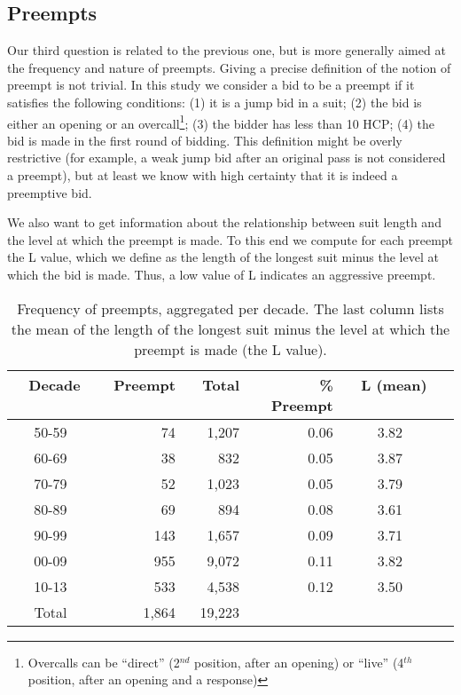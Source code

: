 \documentclass{llncs}
\begin{document}
\subsection{Preempts}

Our third question is related to the previous one, but is more
generally aimed at the frequency and nature of preempts. Giving a
precise definition of the notion of preempt is not trivial. In this
study we consider a bid to be a preempt if it satisfies the following
conditions: (1) it is a jump bid in a suit; (2) the bid is either an
opening or an overcall\footnote{%
  Overcalls can be ``direct'' (2$^{nd}$ position, after an opening) or
  ``live'' (4$^{th}$ position, after an opening and a response)}; (3)
the bidder has less than 10 HCP; (4) the bid is made in the first
round of bidding.  This definition might be overly restrictive (for
example, a weak jump bid after an original pass is not considered a
preempt), but at least we know with high certainty that it is indeed a
preemptive bid.

We also want to get information about the relationship between suit
length and the level at which the preempt is made. To this end we
compute for each preempt the L value, which we define as the length of
the longest suit minus the level at which the bid is made.  Thus, a
low value of L indicates an aggressive preempt.

\begin{table}
\caption{Frequency of preempts, aggregated per decade. The last column
lists the mean of the length of the longest suit minus the level at
which the preempt is made (the L value).}
\centering\footnotesize
\label{tbl:preempt}
\begin{tabular}{|c|r|r|r|c|c|}
\hline
\bf \ Decade \ & \bf Preempt \ & \bf Total  \ & 
\bf \% Preempt & \bf \ L (mean) \  \\ 
\hline\hline
50-59 & 74 & 1,207 & 0.06 & 3.82 \\ 
60-69 & 38 & 832& 0.05 & 3.87 \\
70-79 & 52 & 1,023 & 0.05 & 3.79 \\
80-89 & 69 & 894 & 0.08 & 3.61 \\
90-99 & 143 & 1,657 & 0.09 & 3.71 \\
00-09 & 955 & 9,072 & 0.11 & 3.82 \\ 
10-13 & 533 & 4,538 & 0.12 & 3.50 \\
\hline
Total  & 1,864 & 19,223 &  & \\ 
\hline
\end{tabular}
\end{table}
\end{document}

